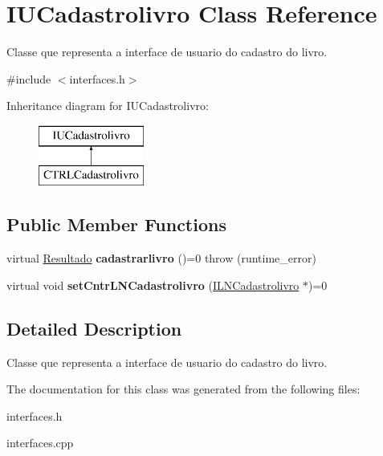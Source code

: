 \hypertarget{classIUCadastrolivro}{}\section{I\+U\+Cadastrolivro Class Reference}
\label{classIUCadastrolivro}


Classe que representa a interface de usuario do cadastro do livro.  




{\ttfamily \#include $<$interfaces.\+h$>$}

Inheritance diagram for I\+U\+Cadastrolivro\+:\begin{figure}[H]
\begin{center}
\leavevmode
\includegraphics[height=2.000000cm]{classIUCadastrolivro}
\end{center}
\end{figure}
\subsection*{Public Member Functions}
\begin{DoxyCompactItemize}
\item 
\mbox{\label{classIUCadastrolivro_a356b23a58950960453d24732018432e1}} 
virtual \hyperlink{classResultado}{Resultado} {\bfseries cadastrarlivro} ()=0  throw (runtime\+\_\+error)
\item 
\mbox{\label{classIUCadastrolivro_a7e660ae3e25cb51040f80a0c422b42d7}} 
virtual void {\bfseries set\+Cntr\+L\+N\+Cadastrolivro} (\hyperlink{classILNCadastrolivro}{I\+L\+N\+Cadastrolivro} $\ast$)=0
\end{DoxyCompactItemize}


\subsection{Detailed Description}
Classe que representa a interface de usuario do cadastro do livro. 

The documentation for this class was generated from the following files\+:\begin{DoxyCompactItemize}
\item 
interfaces.\+h\item 
interfaces.\+cpp\end{DoxyCompactItemize}
